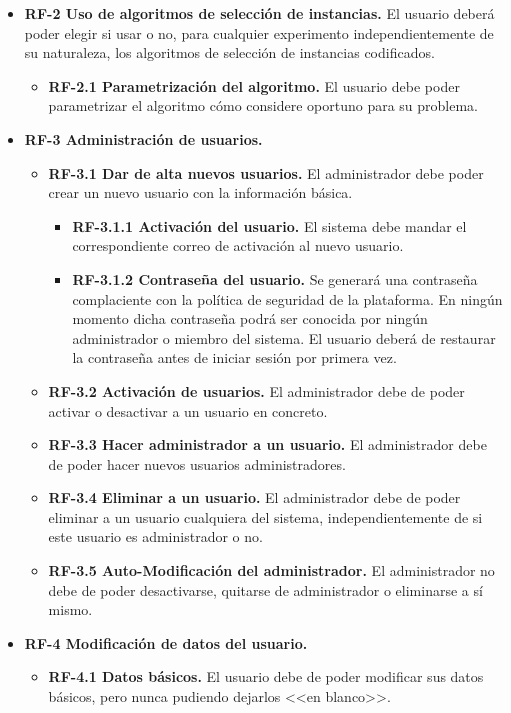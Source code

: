 \begin{itemize}
\begin{itemize}
  \end{itemize}
\item \textbf{RF-2 Uso de algoritmos de selección de instancias.} El usuario deberá poder elegir si usar o no, para cualquier experimento independientemente de su naturaleza, los algoritmos de selección de instancias codificados.
	\begin{itemize}
	\tightlist
	\item \textbf{RF-2.1 Parametrización del algoritmo.} El usuario debe poder parametrizar el algoritmo cómo considere oportuno para su problema.
\end{itemize}
\item \textbf{RF-3 Administración de usuarios.}
	\begin{itemize}
	\tightlist
	\item \textbf{RF-3.1 Dar de alta nuevos usuarios.} El administrador debe poder crear un nuevo usuario con la información básica.
	\begin{itemize}
	\tightlist
	\item \textbf{RF-3.1.1 Activación del usuario.} El sistema debe mandar el correspondiente correo de activación al nuevo usuario.
	\item \textbf{RF-3.1.2 Contraseña del usuario.} Se generará una contraseña complaciente con la política de seguridad de la plataforma. En ningún momento dicha contraseña podrá ser conocida por ningún administrador o miembro del sistema. El usuario deberá de restaurar la contraseña antes de iniciar sesión por primera vez.
	\end{itemize}
	\item \textbf{RF-3.2 Activación de usuarios.} El administrador debe de poder activar o desactivar a un usuario en concreto.
	\item \textbf{RF-3.3 Hacer administrador a un usuario.} El administrador debe de poder hacer nuevos usuarios administradores.
	\item \textbf{RF-3.4 Eliminar a un usuario.} El administrador debe de poder eliminar a un usuario cualquiera del sistema, independientemente de si este usuario es administrador o no.
	\item \textbf{RF-3.5 Auto-Modificación del administrador.} El administrador no debe de poder desactivarse, quitarse de administrador o eliminarse a sí mismo.
	\end{itemize}
\item \textbf{RF-4 Modificación de datos del usuario.}
	\begin{itemize}
	\tightlist
	\item \textbf{RF-4.1 Datos básicos.} El usuario debe de poder modificar sus datos básicos, pero nunca pudiendo dejarlos <<en blanco>>.

\end{itemize}
\end{itemize}
